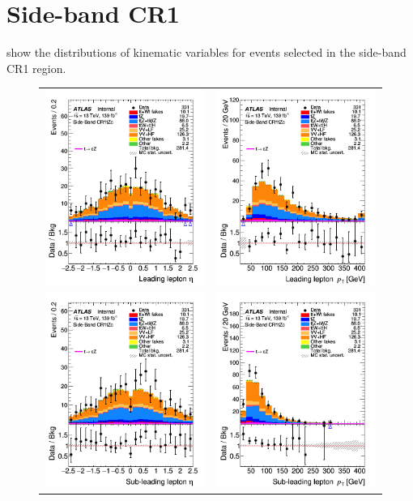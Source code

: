 \clearpage
\FloatBarrier
\section{Side-band CR1}
\label{app:CRs:SB1}
 show the distributions 
of kinematic variables for events selected in the side-band CR1 region. 

\begin{figure}[!htbp]
	\centering
	\begin{tabular}{cc}
		\includegraphics[width=.32\textwidth]{Appendices/AP5/figures/SBCR1/lep1_eta} &
		\includegraphics[width=.32\textwidth]{Appendices/AP5/figures/SBCR1/lep1_pt} \\
		\includegraphics[width=.32\textwidth]{Appendices/AP5/figures/SBCR1/lep2_eta} &
		\includegraphics[width=.32\textwidth]{Appendices/AP5/figures/SBCR1/lep2_pt} \\

\end{tabular}
\end{figure}
